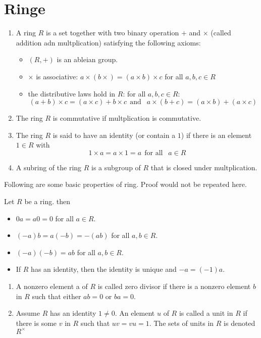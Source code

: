 \section{Ringe}
\begin{definition}[Ring]
    \begin{enumerate}
        \item A ring $R$ is a set together with two binary operation $+$ and $\times$ (called addition adn multplication) satisfying the following axioms:\begin{itemize}
            \item $(R,+)$ is an  ableian group.
            \item $\times$ is associative: \(a\times(b\times) = (a\times b)\times c\)   for all \(a,b,c\in R\)
            \item the distributive laws hold in \(R\): for all \(a, b,c \in R\):
            \[(a+b)\times c =(a\times c)+b\times c\ \ \text{and }\ \ a\times(b+c) = (a\times b)+ (a\times c)\]
        \end{itemize}
        \item The ring $R$ is commutative if multplication is commutative.
        \item The ring $R$ is said to have an identity (or contain a $1$) if there is an element \(1\in R\) with \[1\times a = a \times 1 = a \ \ \text{for all }\ \ a\in R\]
        \item A subring of the ring \(R\) is a subgroup of \(R\) that is closed under multplication.
    \end{enumerate}
\end{definition}

Following are some basic properties of ring. Proof would not be repeated here.

\begin{proposition}
    Let \(R\) be a ring. then
    \begin{itemize}
        \item \(0a =a0=0\) for all \(a \in R\).
        \item \((-a)b=a(-b)=-(ab)\) for all \(a,b\in R\).
        \item \((-a)(-b) = ab \) for all \(a,b\in R\).
        \item If $R$ has an identity, then the identity is unique and \(-a = (-1)a\).
    \end{itemize}
\end{proposition}

\begin{definition}
    \begin{enumerate}
        \item A nonzero element a of \(R\) is called zero divisor if there is a nonzero element \(b\) in \(R\) such that either \(ab = 0\) or \(ba = 0\).
        \item Assume \(R\) has an identity \(1\not = 0\). An element \(u\) of \(R \) is called a unit in \(R\) if there is some \(v\) in \(R \) such that \(uv =vu = 1\). The sets of units in \(R\) is denoted \(R^\times\)
    \end{enumerate}
\end{definition}


